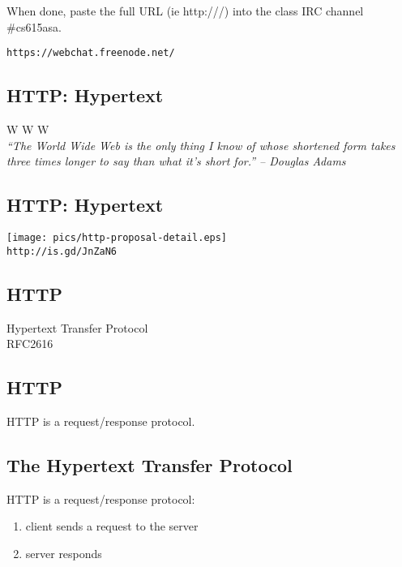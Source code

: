 \documentclass[xga]{xdvislides}
\begin{document}
When done, paste the full URL (ie http:///) into the class IRC channel
\#cs615asa.

{\tt https://webchat.freenode.net/}
\vspace*{\fill}


\subsection{HTTP: Hypertext}
\vspace{.5in}
\begin{center}
	\Huge
	W W W
	\\
\vspace{.5in}
	{\em ``The World Wide Web is the only thing I know of whose shortened form
	takes three times longer to say than what it's short for.'' -- Douglas Adams}
\end{center}
\Normalsize


\subsection{HTTP: Hypertext}
\begin{center}
	\texttt{[image: pics/http-proposal-detail.eps]} \\
	\vspace{.5in}
	\verb+http://is.gd/JnZaN6+
\end{center}

\subsection{HTTP}
\vspace{.5in}
\begin{center}
	\Huge
	Hypertext Transfer Protocol
	\\
	\vspace{.5in}
	RFC2616
\end{center}
\Normalsize

\subsection{HTTP}
\vspace{.5in}
\begin{center}
	\Huge
	HTTP is a request/response protocol.
\end{center}
\Normalsize

\subsection{The Hypertext Transfer Protocol}
HTTP is a request/response protocol:
\begin{enumerate}
	\item client sends a request to the server
	\item server responds
\end{enumerate}
\end{document}
